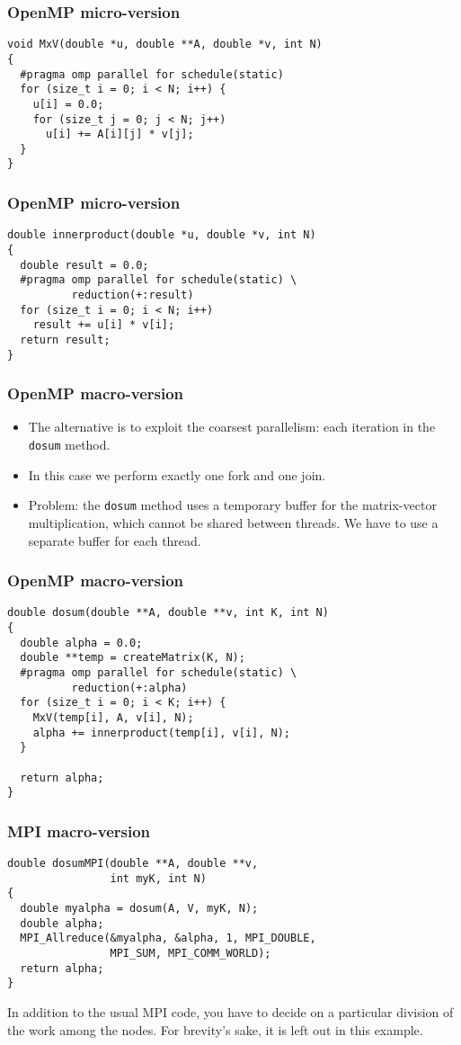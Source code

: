 \begin{frame}[fragile]
  \frametitle{OpenMP micro-version}
\begin{lstlisting}[style=c]
void MxV(double *u, double **A, double *v, int N)
{
  #pragma omp parallel for schedule(static)
  for (size_t i = 0; i < N; i++) {
    u[i] = 0.0;
    for (size_t j = 0; j < N; j++)
      u[i] += A[i][j] * v[j];
  }
}
\end{lstlisting}
\end{frame}

\begin{frame}[fragile]
  \frametitle{OpenMP micro-version}
\begin{lstlisting}[style=c]
double innerproduct(double *u, double *v, int N)
{
  double result = 0.0;
  #pragma omp parallel for schedule(static) \
          reduction(+:result)
  for (size_t i = 0; i < N; i++)
    result += u[i] * v[i];
  return result;
}
\end{lstlisting}
\end{frame}

\begin{frame}
  \frametitle{OpenMP macro-version}
  \begin{itemize}
  \item The alternative is to exploit the coarsest parallelism: each iteration
    in the \texttt{dosum} method.
  \item In this case we perform exactly one fork and one join.
  \item Problem: the \texttt{dosum} method uses a temporary buffer for the
    matrix-vector multiplication, which cannot be shared between threads. We
    have to use a separate buffer for each thread.
  \end{itemize}
\end{frame}

\begin{frame}[fragile]
  \frametitle{OpenMP macro-version}
\begin{lstlisting}[style=c]
double dosum(double **A, double **v, int K, int N)
{
  double alpha = 0.0;
  double **temp = createMatrix(K, N);
  #pragma omp parallel for schedule(static) \
          reduction(+:alpha)
  for (size_t i = 0; i < K; i++) {
    MxV(temp[i], A, v[i], N);
    alpha += innerproduct(temp[i], v[i], N);
  }

  return alpha;
}
\end{lstlisting}
\end{frame}

\begin{frame}[fragile]
  \frametitle{MPI macro-version}
\begin{lstlisting}[style=c]
double dosumMPI(double **A, double **v,
                int myK, int N)
{
  double myalpha = dosum(A, V, myK, N);
  double alpha;
  MPI_Allreduce(&myalpha, &alpha, 1, MPI_DOUBLE,
                MPI_SUM, MPI_COMM_WORLD);
  return alpha;
}
\end{lstlisting}
  In addition to the usual MPI code, you have to decide on a particular division
  of the work among the nodes. For brevity's sake, it is left out in this
  example.
\end{frame}


